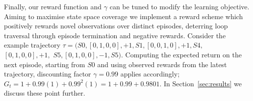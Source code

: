 \documentclass[runningheads]{llncs}
\begin{document}

Finally, our reward function and $\gamma$ can be tuned to modify the learning objective. Aiming to maximise state space coverage we implement a reward scheme which positively rewards novel observations over distinct episodes, deterring loop traversal through episode termination and negative rewards. Consider the example trajectory $\tau =(S0, [0,1,0,0], + 1, S1, [0,0,1,0], + 1, S4,$ $[0,1,0,0], + 1,$ $S5, [0,1,0,0], -1, S5)$. Computing the expected return on the next episode, starting from $S0$ and using observed rewards from the latest trajectory, discounting factor $\gamma = 0.99$ applies accordingly; $G_t = 1 + 0.99(1) + 0.99^{2}(1) = 1 + 0.99 + 0.9801$.  In Section~\ref{sec:results} we discuss these point further.
\end{document}
